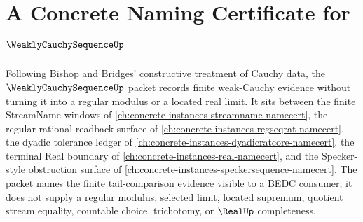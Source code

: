 \chapter{A Concrete Naming Certificate for $\WeaklyCauchySequenceUp$}
\label{ch:concrete-instances-weakly-cauchy-sequence-namecert}

Following Bishop and Bridges' constructive treatment of Cauchy data, the $\WeaklyCauchySequenceUp$ packet records finite weak-Cauchy evidence without turning it into a regular modulus or a located real limit. It sits between the finite StreamName windows of \autoref{ch:concrete-instances-streamname-namecert}, the regular rational readback surface of \autoref{ch:concrete-instances-regseqrat-namecert}, the dyadic tolerance ledger of \autoref{ch:concrete-instances-dyadicratcore-namecert}, the terminal Real boundary of \autoref{ch:concrete-instances-real-namecert}, and the Specker-style obstruction surface of \autoref{ch:concrete-instances-speckersequence-namecert}. The packet names the finite tail-comparison evidence visible to a BEDC consumer; it does not supply a regular modulus, selected limit, located supremum, quotient stream equality, countable choice, trichotomy, or $\RealUp$ completeness.

